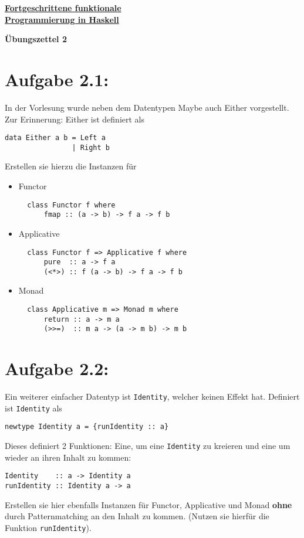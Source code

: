 \documentclass[a4paper,10pt]{scrartcl}
\newcommand{\underfat}[1]{\underline{\textbf{#1}}}
\newcommand{\theuebungszettel}{2}
\begin{document}
\begin{center}
  \begin{huge}
    \underfat{Fortgeschrittene funktionale}\\
    \underfat{Programmierung in Haskell}\\
  \end{huge}
\begin{LARGE}
\textbf{Übungszettel \theuebungszettel}
\end{LARGE}
\end{center}
\section*{Aufgabe \theuebungszettel.1:}
In der Vorlesung wurde neben dem Datentypen Maybe auch Either vorgestellt. Zur Erinnerung: Either ist definiert als
\begin{verbatim}
data Either a b = Left a
                | Right b
\end{verbatim}
Erstellen sie hierzu die Instanzen für
\begin{itemize}
 \item Functor
       \begin{verbatim}
  class Functor f where
      fmap :: (a -> b) -> f a -> f b
       \end{verbatim}
 \item Applicative
       \begin{verbatim}
  class Functor f => Applicative f where
      pure  :: a -> f a
      (<*>) :: f (a -> b) -> f a -> f b
       \end{verbatim}
 \item Monad
       \begin{verbatim}
  class Applicative m => Monad m where
      return :: a -> m a
      (>>=)  :: m a -> (a -> m b) -> m b
       \end{verbatim}
\end{itemize}
\section*{Aufgabe \theuebungszettel.2:}
Ein weiterer einfacher Datentyp ist \texttt{Identity}, welcher keinen Effekt hat. Definiert ist \texttt{Identity} als
\begin{verbatim}
newtype Identity a = {runIdentity :: a}
\end{verbatim}
Dieses definiert 2 Funktionen: Eine, um eine \texttt{Identity} zu kreieren und eine um wieder an ihren Inhalt zu kommen:
\begin{verbatim}
Identity    :: a -> Identity a
runIdentity :: Identity a -> a
\end{verbatim}
Erstellen sie hier ebenfalls Instanzen für Functor, Applicative und Monad \textbf{ohne} durch Patternmatching an den Inhalt zu kommen. (Nutzen sie hierfür die Funktion \texttt{runIdentity}).
\end{document}
